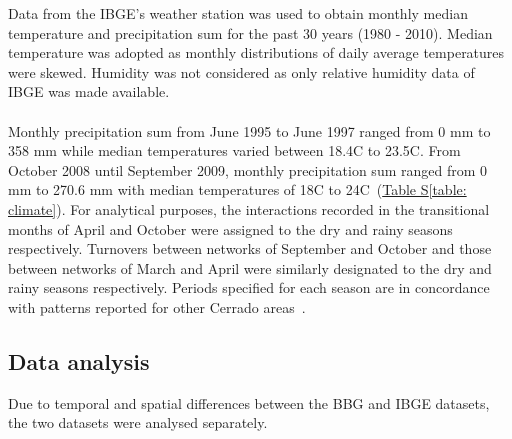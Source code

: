 \documentclass[11pt]{article}
\begin{document}
Data from the IBGE's weather station was used to obtain monthly median temperature and precipitation sum for the past 30 years (1980 - 2010). Median temperature was adopted as monthly distributions of daily average temperatures were skewed. Humidity was not considered as only relative humidity data of IBGE was made available.\\
\\
Monthly precipitation sum from June 1995 to June 1997 ranged from 0 mm to 358 mm while median temperatures varied between 18.4\degree C to 23.5\degree C. From October 2008 until September 2009, monthly precipitation sum ranged from 0 mm to 270.6 mm with median temperatures of 18\degree C to 24\degree C~(\hyperref[table: climate]{Table S\ref{table: climate}}). For analytical purposes, the interactions recorded in the transitional months of April and October were assigned to the dry and rainy seasons respectively. Turnovers between networks of September and October and those between networks of March and April were similarly designated to the dry and rainy seasons respectively. Periods specified for each season are in concordance with patterns reported for other Cerrado areas~\citep{Gottsberger2006a}. 

\subsection{Data analysis}
Due to temporal and spatial differences between the BBG and IBGE datasets, the two datasets were analysed separately. 
\end{document}
